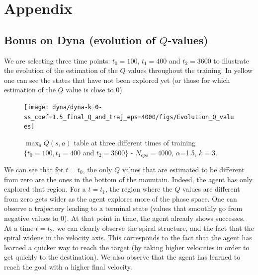 \documentclass[a4paper, 12pt,oneside]{article}
\begin{document}
        \section{Appendix}
        \subsection{Bonus on Dyna (evolution of $Q$-values)}
        We are selecting three time points: $t_0=100$, $t_1=400$ and $t_2=3600$ to illustrate the evolution of the estimation of the $Q$ values throughout the training. In yellow one can see the states that have not been explored yet (or those for which estimation of the $Q$ value is close to 0).
        \begin{figure}[h]
            \centering
            \texttt{[image: dyna/dyna-k=0-ss\_coef=1.5\_final\_Q\_and\_traj\_eps=4000/figs/Evolution\_Q\_values]}
            \caption{$\max_a Q(s,a)$ table at three different times of training $\{t_0=100,t_1=400$ and $t_2=3600\}$ - $N_{eps}=4000$, $\alpha$=1.5, $k=3$.}
            \label{Qmatrixcounts}
        \end{figure}

        We can see that for $t=t_0$, the only $Q$ values that are estimated to be different from zero are the ones in the bottom of the mountain. Indeed, the agent has only explored that region. For a $t=t_1$, the region where the $Q$ values are different from zero gets wider as the agent explores more of the phase space. One can observe a trajectory leading to a terminal state (values that smoothly go from negative values to 0). At that point in time, the agent already shows successes. At a time $t=t_2$, we can clearly observe the spiral structure, and the fact that the spiral widens in the velocity axis. This corresponds to the fact that the agent has learned a quicker way to reach the target (by taking higher velocities in order to get quickly to the destination). We also observe that the agent has learned to reach the goal with a higher final velocity.
        
\end{document}
